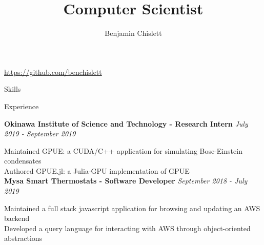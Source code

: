 \documentclass[11pt, letterpaper]{article}
\title{Computer Scientist}
\author{Benjamin Chislett}
\date{}
\begin{document}
\begin{center}
  \Huge\theauthor
  \par
  \huge\thetitle
  \par
  \large\url{https://github.com/benchislett}
\end{center}

\begin{section}{Skills}


\end{section}

\begin{section}{Experience}

\textbf{Okinawa Institute of Science and Technology - Research Intern}
\hfill
\textit{July 2019 - September 2019}

Maintained GPUE: a CUDA/C++ application for simulating Bose-Einstein condensates\\
Authored GPUE.jl: a Julia-GPU implementation of GPUE\\

\textbf{Mysa Smart Thermostats - Software Developer}
\hfill
\textit{September 2018 - July 2019}

Maintained a full stack javascript application for browsing and updating an AWS backend\\
Developed a query language for interacting with AWS through object-oriented abstractions
\end{section}
\end{document}
